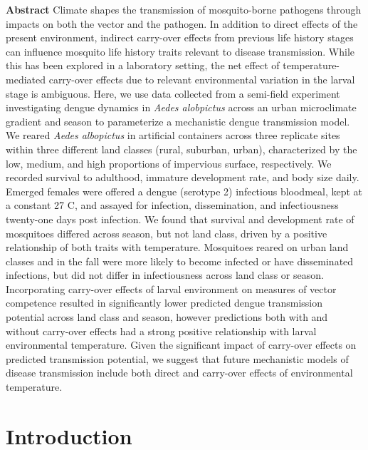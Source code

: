 \documentclass[12pt]{article}
\begin{document}
\textbf{Abstract} Climate shapes the transmission of mosquito-borne pathogens through impacts on both the vector and the pathogen.  In addition to direct effects of the present environment, indirect carry-over effects from previous life history stages can influence mosquito life history traits relevant to disease transmission. While this has been explored in a laboratory setting, the net effect of temperature-mediated carry-over effects due to relevant environmental variation in the larval stage is ambiguous. Here, we use data collected from a semi-field experiment investigating dengue dynamics in \textit{Aedes alobpictus} across an urban microclimate gradient and season to parameterize a mechanistic dengue transmission model. We reared \textit{Aedes albopictus} in artificial containers across three replicate sites within three different land classes (rural, suburban, urban), characterized by the low, medium, and high proportions of impervious surface, respectively. We recorded survival to adulthood, immature development rate, and body size daily. Emerged females were offered a dengue (serotype 2) infectious bloodmeal, kept at a constant 27 C, and assayed for infection, dissemination, and infectiousness twenty-one days post infection. We found that survival and development rate of mosquitoes differed across season, but not land class, driven by a positive relationship of both traits with temperature. Mosquitoes reared on urban land classes and in the fall were more likely to become infected or have disseminated infections, but did not differ in infectiousness across land class or season. Incorporating carry-over effects of larval environment on measures of vector competence resulted in significantly lower predicted dengue transmission potential across land class and season, however predictions both with and without carry-over effects had a strong positive relationship with larval environmental temperature. Given the significant impact of carry-over effects on predicted transmission potential, we suggest that future mechanistic models of disease transmission include both direct and carry-over effects of environmental temperature.

\hrulefill

\linenumbers
\doublespacing

\section{Introduction}

\end{document}
